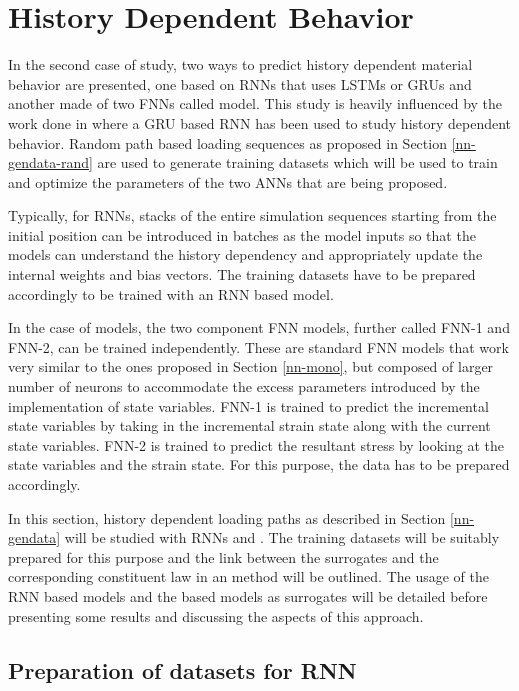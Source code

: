 \section{History Dependent Behavior}\label{nn-dnn}

In the second case of study, two ways to predict history dependent material behavior are presented, one based on RNNs that uses LSTMs or GRUs and another made of two FNNs called \fnn model. This study is heavily influenced by the work done in \cite{wuRecurrentNeuralNetworkaccelerated2020} where a GRU based RNN has been used to study history dependent behavior. Random path based loading sequences as proposed in Section \ref{nn-gendata-rand} are used to generate training datasets which will be used to train and optimize the parameters of the two ANNs that are being proposed. 

Typically, for RNNs, stacks of the entire simulation sequences starting from the initial position can be introduced in batches as the model inputs so that the models can understand the history dependency and appropriately update the internal weights and bias vectors. The training datasets have to be prepared accordingly to be trained with an RNN based model.

In the case of \fnn models, the two component FNN models, further called \mbox{FNN-1} and \mbox{FNN-2}, can be trained independently. These are standard FNN models that work very similar to the ones proposed in Section \ref{nn-mono}, but composed of larger number of neurons to accommodate  the excess parameters introduced by the implementation of state variables. \mbox{FNN-1} is trained to predict the incremental state variables by taking in the incremental strain state along with the current state variables. \mbox{FNN-2} is trained to predict the resultant stress by looking at the state variables and the strain state. For this purpose, the data has to be prepared accordingly.

In this section, history dependent loading paths as described in Section \ref{nn-gendata} will be studied with RNNs and \fnn. The training datasets will be suitably prepared for this purpose and the link between the surrogates and the corresponding constituent law in an \fee method will be outlined. The usage of the RNN based models and the \fnn based models as surrogates will be detailed before presenting some results and discussing the aspects of this approach.

\subsection{Preparation of datasets for RNN}\label{nn-dnn-dataprep}

